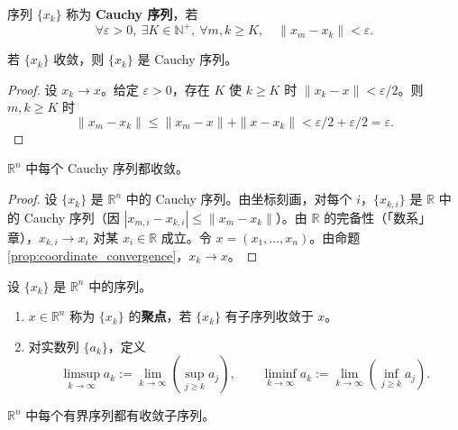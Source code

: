 \begin{definition}[Cauchy 序列]\label{def:cauchy_sequence}
序列 $\{x_k\}$ 称为 \textbf{Cauchy 序列}，若
\[
\forall \varepsilon > 0,\ \exists K \in \mathbb{N}^+,\ \forall m, k \ge K,\quad \|x_m - x_k\| < \varepsilon.
\]
\end{definition}

\begin{proposition}\label{prop:convergent_cauchy_ra}
若 $\{x_k\}$ 收敛，则 $\{x_k\}$ 是 Cauchy 序列。
\end{proposition}

\begin{proof}
设 $x_k \to x$。给定 $\varepsilon > 0$，存在 $K$ 使 $k \ge K$ 时 $\|x_k - x\| < \varepsilon/2$。则 $m, k \ge K$ 时
\[
\|x_m - x_k\| \le \|x_m - x\| + \|x - x_k\| < \varepsilon/2 + \varepsilon/2 = \varepsilon.
\]
\end{proof}

\begin{theorem}\label{thm:rn_completeness}
$\mathbb{R}^n$ 中每个 Cauchy 序列都收敛。
\end{theorem}

\begin{proof}
设 $\{x_k\}$ 是 $\mathbb{R}^n$ 中的 Cauchy 序列。由坐标刻画，对每个 $i$，$\{x_{k,i}\}$ 是 $\mathbb{R}$ 中的 Cauchy 序列（因 $|x_{m,i} - x_{k,i}| \le \|x_m - x_k\|$）。由 $\mathbb{R}$ 的完备性（「数系」章），$x_{k,i} \to x_i$ 对某 $x_i \in \mathbb{R}$ 成立。令 $x = (x_1, \dots, x_n)$。由命题 \ref{prop:coordinate_convergence}，$x_k \to x$。
\end{proof}

\begin{definition}[聚点与上下极限]\label{def:cluster_upper_lower_limit}
设 $\{x_k\}$ 是 $\mathbb{R}^n$ 中的序列。
\begin{enumerate}[label=(\roman*)]
    \item $x \in \mathbb{R}^n$ 称为 $\{x_k\}$ 的\textbf{聚点}，若 $\{x_k\}$ 有子序列收敛于 $x$。
    \item 对实数列 $\{a_k\}$，定义
    \[
    \limsup_{k \to \infty} a_k := \lim_{k \to \infty} \left( \sup_{j \ge k} a_j \right), \qquad \liminf_{k \to \infty} a_k := \lim_{k \to \infty} \left( \inf_{j \ge k} a_j \right).
    \]
\end{enumerate}
\end{definition}

\begin{theorem}\label{thm:bolzano_weierstrass_seq}
$\mathbb{R}^n$ 中每个有界序列都有收敛子序列。
\end{theorem}

